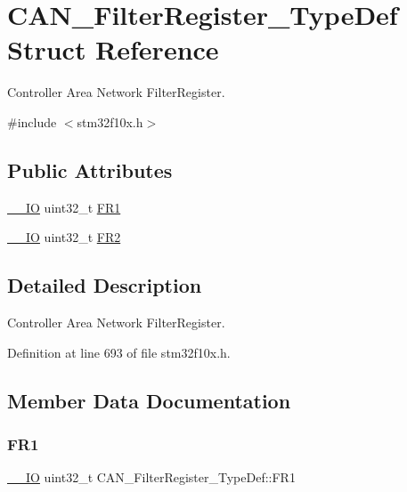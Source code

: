 \hypertarget{struct_c_a_n___filter_register___type_def}{}\section{C\+A\+N\+\_\+\+Filter\+Register\+\_\+\+Type\+Def Struct Reference}
\label{struct_c_a_n___filter_register___type_def}


Controller Area Network Filter\+Register.  




{\ttfamily \#include $<$stm32f10x.\+h$>$}

\subsection*{Public Attributes}
\begin{DoxyCompactItemize}
\item 
\hyperlink{core__sc300_8h_aec43007d9998a0a0e01faede4133d6be}{\+\_\+\+\_\+\+IO} uint32\+\_\+t \hyperlink{struct_c_a_n___filter_register___type_def_ac9bc1e42212239d6830582bf0c696fc5}{F\+R1}
\item 
\hyperlink{core__sc300_8h_aec43007d9998a0a0e01faede4133d6be}{\+\_\+\+\_\+\+IO} uint32\+\_\+t \hyperlink{struct_c_a_n___filter_register___type_def_a77959e28a302b05829f6a1463be7f800}{F\+R2}
\end{DoxyCompactItemize}


\subsection{Detailed Description}
Controller Area Network Filter\+Register. 

Definition at line 693 of file stm32f10x.\+h.



\subsection{Member Data Documentation}
\mbox{\label{struct_c_a_n___filter_register___type_def_ac9bc1e42212239d6830582bf0c696fc5}} 
\subsubsection{\texorpdfstring{F\+R1}{FR1}}
{\footnotesize\ttfamily \hyperlink{core__sc300_8h_aec43007d9998a0a0e01faede4133d6be}{\+\_\+\+\_\+\+IO} uint32\+\_\+t C\+A\+N\+\_\+\+Filter\+Register\+\_\+\+Type\+Def\+::\+F\+R1}



